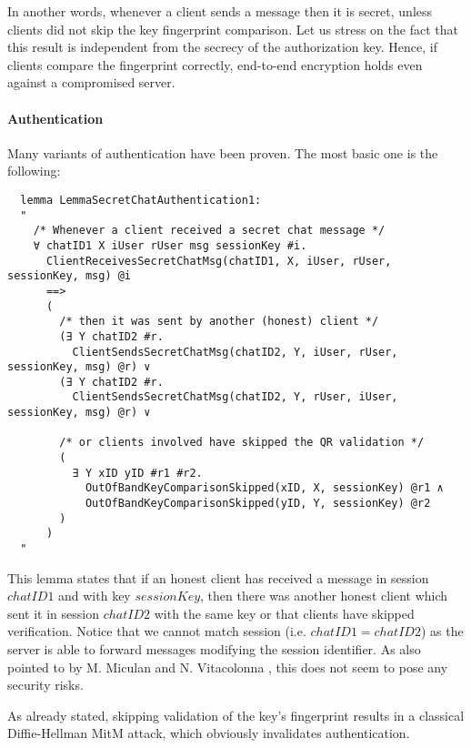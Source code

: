In another words, whenever a client sends a message then it is secret, unless clients did not skip the key fingerprint comparison. Let us stress on the fact that this result is independent from the secrecy of the authorization key. Hence, if clients compare the fingerprint correctly, end-to-end encryption holds even against a compromised server.

\paragraph{Authentication}
Many variants of authentication have been proven. The most basic one is the following:

\begin{lstlisting}
  lemma LemmaSecretChatAuthentication1:
  "
    /* Whenever a client received a secret chat message */
    ∀ chatID1 X iUser rUser msg sessionKey #i.
      ClientReceivesSecretChatMsg(chatID1, X, iUser, rUser, sessionKey, msg) @i
      ==>
      (
        /* then it was sent by another (honest) client */
        (∃ Y chatID2 #r. 
          ClientSendsSecretChatMsg(chatID2, Y, iUser, rUser, sessionKey, msg) @r) ∨
        (∃ Y chatID2 #r. 
          ClientSendsSecretChatMsg(chatID2, Y, rUser, iUser, sessionKey, msg) @r) ∨

        /* or clients involved have skipped the QR validation */
        (
          ∃ Y xID yID #r1 #r2. 
            OutOfBandKeyComparisonSkipped(xID, X, sessionKey) @r1 ∧
            OutOfBandKeyComparisonSkipped(yID, Y, sessionKey) @r2
        )
      )
  "
\end{lstlisting}

This lemma states that if an honest client has received a message in session $chatID1$ and with key $sessionKey$, then there was another honest client which sent it in session $chatID2$ with the same key or that clients have skipped verification. Notice that we cannot match session (i.e. $chatID1 = chatID2$) as the server is able to forward messages modifying the session identifier. As also pointed to by M. Miculan and N. Vitacolonna \cite{MTProto2-Proverif}, this does not seem to pose any security risks.

As already stated, skipping validation of the key's fingerprint results in a classical Diffie-Hellman MitM attack, which obviously invalidates authentication.

